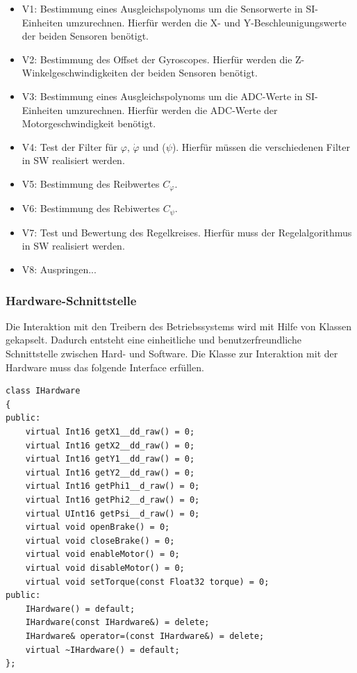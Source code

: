 \begin{itemize}
 \item V1: Bestimmung eines Ausgleichspolynoms um die Sensorwerte in SI-Einheiten umzurechnen. Hierfür werden die X- und Y-Beschleunigungswerte der beiden Sensoren benötigt.
 \item V2: Bestimmung des Offset der Gyroscopes. Hierfür werden die Z-Winkelgeschwindigkeiten der beiden Sensoren benötigt.
 \item V3: Bestimmung eines Ausgleichspolynoms um die ADC-Werte in SI-Einheiten umzurechnen. Hierfür werden die ADC-Werte der Motorgeschwindigkeit benötigt.
 \item V4: Test der Filter für $\varphi$, $\dot{\varphi}$ und ($\psi$). Hierfür müssen die verschiedenen Filter in SW realisiert werden.
 \item V5: Bestimmung des Reibwertes $C_{\varphi}$.
 \item V6: Bestimmung des Rebiwertes $C_{\psi}$.
 \item V7: Test und Bewertung des Regelkreises. Hierfür muss der Regelalgorithmus in SW realisiert werden.
 \item V8: Auspringen...
\end{itemize}

\subsubsection{Hardware-Schnittstelle}
Die Interaktion mit den Treibern des Betriebssystems wird mit Hilfe von Klassen gekapselt. Dadurch entsteht eine einheitliche und benutzerfreundliche Schnittstelle zwischen Hard- und Software. Die Klasse zur Interaktion mit der Hardware muss das folgende Interface erfüllen.

\newpage
\begin{lstlisting}
class IHardware
{
public:
	virtual Int16 getX1__dd_raw() = 0;
	virtual Int16 getX2__dd_raw() = 0;
	virtual Int16 getY1__dd_raw() = 0;
	virtual Int16 getY2__dd_raw() = 0;
	virtual Int16 getPhi1__d_raw() = 0;
	virtual Int16 getPhi2__d_raw() = 0;
	virtual UInt16 getPsi__d_raw() = 0;
	virtual void openBrake() = 0;
	virtual void closeBrake() = 0;
	virtual void enableMotor() = 0;
	virtual void disableMotor() = 0;
	virtual void setTorque(const Float32 torque) = 0;
public:
	IHardware() = default;
	IHardware(const IHardware&) = delete;
	IHardware& operator=(const IHardware&) = delete;
	virtual ~IHardware() = default;
};

\end{lstlisting}


